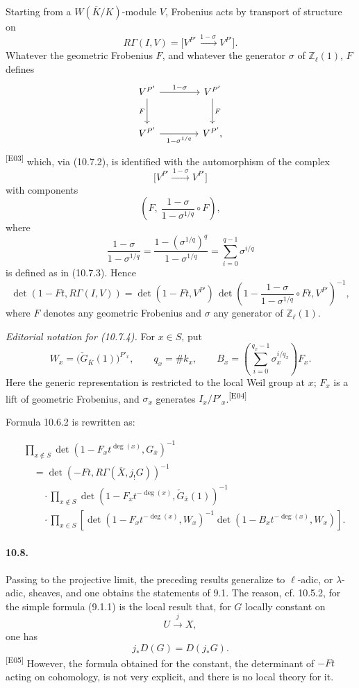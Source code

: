 \documentclass[10pt,letterpaper]{article}
\newcommand{\Z}{\mathbb Z}
\newcommand{\auditmark}[1]{\textsuperscript{\normalfont\scriptsize[E#1]}}
\begin{document}
\begin{enumerate}[label=(\alph*)]
Starting from a \(W(\overline K/K)\)-module \(V\), Frobenius acts by transport of structure on
\[
R\Gamma(I,V)=
\bigl[V^{P'}\xrightarrow{\,1-\sigma\,}V^{P'}\bigr].
\]
Whatever the geometric Frobenius \(F\), and whatever the generator \(\sigma\) of \(\Z_\ell(1)\), \(F\) defines
\[
\begin{tikzcd}[column sep=4.0em,row sep=2.6em]
V^{P'}\arrow[r,"1-\sigma"]\arrow[d,"F"']&
V^{P'}\arrow[d,"F"]\\
V^{P'}\arrow[r,"1-\sigma^{1/q}"']&
V^{P'},
\end{tikzcd}
\]
\auditmark{03}
which, via (10.7.2), is identified with the automorphism of the complex
\[
\bigl[V^{P'}\xrightarrow{\,1-\sigma\,}V^{P'}\bigr]
\]
with components
\[
\left(F,\ \frac{1-\sigma}{1-\sigma^{1/q}}\circ F\right),
\]
where
\[
\frac{1-\sigma}{1-\sigma^{1/q}}
=
\frac{1-(\sigma^{1/q})^q}{1-\sigma^{1/q}}=\sum_{i=0}^{q-1}\sigma^{i/q}
\]
is defined as in (10.7.3). Hence
\[
\det(1-Ft,R\Gamma(I,V))
=
\det(1-Ft,V^{P'})\,
\det\!\left(1-\frac{1-\sigma}{1-\sigma^{1/q}}\circ Ft,V^{P'}\right)^{-1},
\]
where \(F\) denotes any geometric Frobenius and \(\sigma\) any generator of \(\Z_\ell(1)\).

\par\smallskip\noindent\textit{Editorial notation for (10.7.4).} For \(x\in S\), put
\[
W_x=\bigl(\check G_{\overline K}(1)\bigr)^{P'_x},\qquad
q_x=\#k_x,\qquad
B_x=\left(\sum_{i=0}^{q_x-1}\sigma_x^{i/q_x}\right)F_x.
\]
Here the generic representation is restricted to the local Weil group at \(x\);
\(F_x\) is a lift of geometric Frobenius, and \(\sigma_x\) generates
\(I_x/P'_x\).\auditmark{04}

Formula 10.6.2 is rewritten as:

\[
\tag{10.7.4}
\begin{aligned}
&\prod_{x\notin S}\det(1-F_xt^{\deg(x)},G_{\overline x})^{-1}
\\
&\quad=\det(-Ft,R\Gamma(\overline X,j_!G))^{-1}
\\
&\qquad\cdot\prod_{x\notin S}
\det(1-F_xt^{-\deg(x)},\check G_{\overline x}(1))^{-1}
\\
&\qquad\cdot\prod_{x\in S}
\left[\det(1-F_xt^{-\deg(x)},W_x)^{-1}
\det(1-B_xt^{-\deg(x)},W_x)\right].
\end{aligned}
\]

\end{enumerate}

\paragraph{10.8.} Passing to the projective limit, the preceding results generalize to \(\ell\)-adic, or \(\lambda\)-adic, sheaves, and one obtains the statements of 9.1. The reason, cf. 10.5.2, for the simple formula (9.1.1) is the local result that, for \(G\) locally constant on
\[
U\xrightarrow{j}X,
\]
one has
\[
j_*D(G)=D(j_*G).
\]\auditmark{05}
However, the formula obtained for the constant, the determinant of \(-Ft\) acting on cohomology, is not very explicit, and there is no local theory for it.
\end{document}

